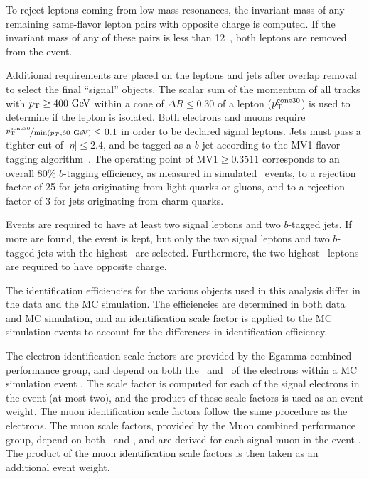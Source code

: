 To reject leptons coming from low mass resonances, the invariant mass of any
remaining same-flavor lepton pairs with opposite charge is computed.
If the invariant mass of any of these pairs is less than 12~\GeV, both leptons
are removed from the event.

Additional requirements are placed on the leptons and jets after overlap
removal to select the final ``signal'' objects.
The scalar sum of the momentum of all tracks with $\pt \geq 400 \GeV$
within a cone of $\Delta R \leq 0.30$ of a lepton ($p_{\mathrm{T}}^\mathrm{cone30}$) is
used to determine if the lepton is isolated.
Both electrons and muons require
$\nicefrac{\pT^{\mathrm{cone30}}}{\min(p_T, 60 \GeV)} \leq 0.1$ in order
to be declared signal leptons.
Jets must pass a tighter cut of $|\eta| \leq 2.4$, and be tagged as a $b$-jet
according to the MV1 flavor tagging
algorithm~\cite{ATLAS-CONF-2014-004, ATLAS-CONF-2014-046}.
The operating point of $\mathrm{MV1} \geq 0.3511$ corresponds to an overall
80\% $b$-tagging efficiency, as measured in simulated \TTBAR\ events, to a
rejection factor of 25 for jets originating from light quarks or gluons, and to
a rejection factor of 3 for jets originating from charm quarks.

Events are required to have at least two signal leptons and two $b$-tagged jets.
If more are found, the event is kept, but only the two signal leptons and two
$b$-tagged jets with the highest \pt\ are selected.
Furthermore, the two highest \pt\ leptons are required to have opposite charge.

The identification efficiencies for the various objects used in this analysis
differ in the data and the MC simulation.
The efficiencies are determined in both data and MC simulation, and an
identification scale factor is applied to the MC simulation events to account
for the differences in identification efficiency.

The electron identification scale factors are provided by the Egamma combined
performance group, and depend on both the \et\ and \eta\ of the electrons within
a MC simulation event \cite{egamma2014}.
The scale factor is computed for each of the signal electrons in the event (at
most two), and the product of these scale factors is used as an event weight.
The muon identification scale factors follow the same procedure as the
electrons.
The muon scale factors, provided by the Muon combined performance group, depend
on both \pt\ and \eta, and are derived for each signal muon in the
event \cite{Aad:2014rra}.
The product of the muon identification scale factors is then taken as an
additional event weight.

